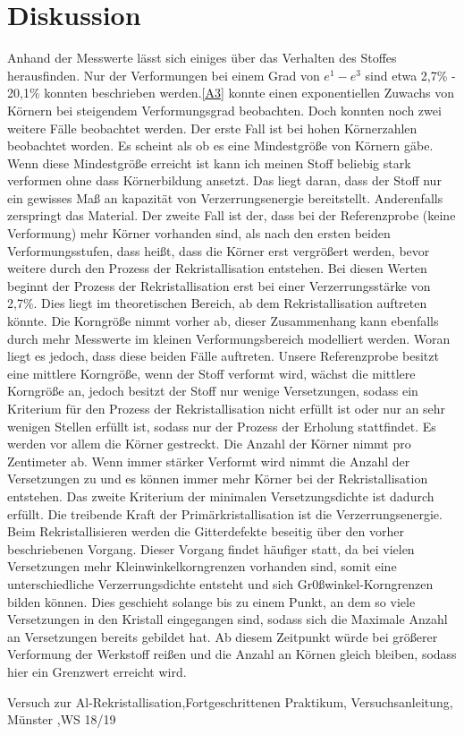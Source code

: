 \documentclass[
	a4paper,
	12pt,
	pagesize,
	ngerman
]{scrartcl}
\begin{document}
\section{Diskussion}
Anhand der Messwerte lässt sich einiges über das Verhalten des Stoffes herausfinden. Nur der Verformungen bei einem Grad von $e^1-e^3$ sind etwa 2,7\% - 20,1\% konnten beschrieben werden.\cref{A3} konnte einen exponentiellen Zuwachs von Körnern bei steigendem Verformungsgrad beobachten. Doch konnten noch zwei weitere Fälle beobachtet werden.
Der erste Fall ist bei hohen Körnerzahlen beobachtet worden. Es scheint als ob es eine Mindestgröße von Körnern gäbe. Wenn diese Mindestgröße erreicht ist kann ich meinen Stoff beliebig stark verformen ohne dass Körnerbildung ansetzt. Das liegt daran, dass der Stoff nur ein gewisses Maß an kapazität von Verzerrungsenergie bereitstellt. Anderenfalls zerspringt das Material.
Der zweite Fall ist der, dass bei der Referenzprobe (keine Verformung) mehr Körner vorhanden sind, als nach den ersten beiden Verformungsstufen, dass heißt, dass die Körner erst vergrößert werden, bevor weitere durch den Prozess der Rekristallisation entstehen. Bei diesen Werten beginnt der Prozess der Rekristallisation erst bei einer Verzerrungsstärke von 2,7\%. Dies liegt im theoretischen Bereich, ab dem Rekristallisation auftreten könnte. Die Korngröße nimmt vorher ab, dieser Zusammenhang kann ebenfalls durch mehr Messwerte im kleinen Verformungsbereich modelliert werden.
Woran liegt es jedoch, dass diese beiden Fälle auftreten. 
Unsere Referenzprobe besitzt eine mittlere Korngröße, wenn der Stoff verformt wird, wächst die mittlere Korngröße an, jedoch besitzt der Stoff nur wenige Versetzungen, sodass ein Kriterium für den Prozess der Rekristallisation nicht erfüllt ist oder nur an sehr wenigen Stellen erfüllt ist, sodass nur der Prozess der Erholung stattfindet. Es werden vor allem die Körner gestreckt. Die Anzahl der Körner nimmt pro Zentimeter ab. Wenn immer stärker Verformt wird nimmt die Anzahl der Versetzungen zu und es können immer mehr Körner bei der Rekristallisation entstehen. Das zweite Kriterium der minimalen Versetzungsdichte ist dadurch erfüllt. 
Die treibende Kraft der Primärkristallisation ist die Verzerrungsenergie. Beim Rekristallisieren werden die Gitterdefekte beseitig über den vorher beschriebenen Vorgang. Dieser Vorgang findet häufiger statt, da bei vielen Versetzungen mehr Kleinwinkelkorngrenzen vorhanden sind, somit eine unterschiedliche Verzerrungsdichte entsteht und sich Gr0ßwinkel-Korngrenzen bilden können. Dies geschieht solange bis zu einem Punkt, an dem so viele Versetzungen in den Kristall eingegangen sind, sodass sich die Maximale Anzahl an Versetzungen bereits gebildet hat. Ab diesem Zeitpunkt würde bei größerer Verformung der Werkstoff reißen und die Anzahl an Körnen gleich bleiben, sodass hier ein Grenzwert erreicht wird.

\newpage

\begin{thebibliography}{9}
	Versuch zur Al-Rekristallisation,Fortgeschrittenen Praktikum, Versuchsanleitung, Münster ,WS 18/19
	
\end{thebibliography}
\end{document}
